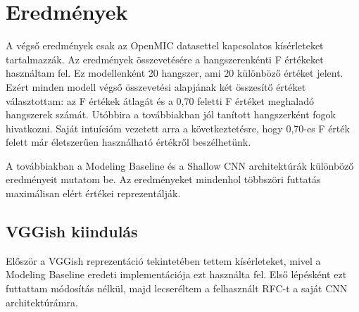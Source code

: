 \section{Eredmények}

A végső eredmények csak az OpenMIC datasettel kapcsolatos kísérleteket tartalmazzák. Az eredmények összevetésére a hangszerenkénti F értékeket használtam fel. Ez modellenként 20 hangszer, ami 20 különböző értéket jelent. Ezért minden modell végső összevetési alapjának két összesítő értéket választottam: az F értékek átlagát és a 0,70 feletti F értéket meghaladó hangszerek számát. Utóbbira a továbbiakban jól tanított hangszerként fogok hivatkozni. Saját intuícióm vezetett arra a következtetésre, hogy 0,70-es F érték felett már életszerűen használható értékről beszélhetünk.

A továbbiakban a Modeling Baseline és a Shallow CNN architektúrák különböző eredményeit mutatom be. Az eredményeket mindenhol többszöri futtatás maximálisan elért értékei reprezentálják.

\subsection{VGGish kiindulás}

Először a VGGish reprezentáció tekintetében tettem kísérleteket, mivel a Modeling Baseline eredeti implementációja ezt használta fel. Első lépésként ezt futtattam módosítás nélkül, majd lecseréltem a felhasznált RFC-t a saját CNN architektúrámra.

